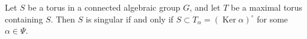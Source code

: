 Let $S$ be a torus in a connected algebraic group $G$, and let $T$ be a maximal torus containing $S$. Then $S$ is singular if and only if $S \subset T_\alpha = (\operatorname{Ker} \alpha)^\circ$ for some $\alpha \in \Psi$.

